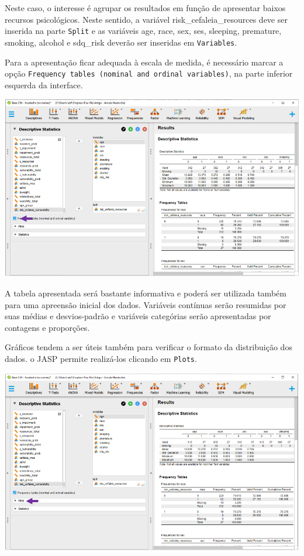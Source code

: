 \documentclass[
]{book}
\begin{document}
Neste caso, o interesse é agrupar os resultados em função de apresentar baixos recursos psicológicos. Neste sentido, a variável risk\_cefaleia\_resources deve ser inserida na parte \texttt{Split} e as variáveis age, race, sex, ses, sleeping, premature, smoking, alcohol e sdq\_risk deverão ser inseridas em \texttt{Variables}.

Para a apresentação ficar adequada à escala de medida, é necessário marcar a opção \texttt{Frequency\ tables\ (nominal\ and\ ordinal\ variables)}, na parte inferior esquerda da interface.

\includegraphics{./img/cap_logistica_descriptives2.png}

A tabela apresentada será bastante informativa e poderá ser utilizada também para uma apreensão inicial dos dados. Variáveis contínuas serão resumidas por suas médias e desvios-padrão e variáveis categórias serão apresentadas por contagens e proporções.

Gráficos tendem a ser úteis também para verificar o formato da distribuição dos dados. o JASP permite realizá-los clicando em \texttt{Plots}.

\includegraphics{./img/cap_logistica_plots.png}
\end{document}
